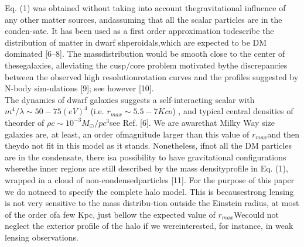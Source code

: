 \documentclass{article}\newcommand\Star[1]{#1\textsuperscript{*}}
\begin{document}
\begin{multicols}{2}
	Eq. (1) was obtained without taking into account thegravitational influence of any other matter sources, andassuming that all the scalar particles are in the conden-sate.  It has been used as a first order approximation todescribe the distribution of matter in dwarf shperoidals,which are expected to be DM dominated [6–8].  The massdistribution would be smooth close to the center of thesegalaxies, alleviating the cusp/core problem motivated bythe  discrepancies  between  the  observed  high  resolutionrotation curves and the profiles suggested by N-body sim-ulations [9]; see however [10].\\
	The   dynamics   of   dwarf   galaxies   suggests   a   self-interacting  scalar  with \(m^{4}/\lambda\sim50-75(eV)^{4}\) (i.e. \( r_{max}\sim5.5-7Kco\)) , and typical central densities of theorder of \(\rho c\sim10^{-3}M_{\odot}/pc^{3}\)see Ref. [6].  We are awarethat  Milky  Way  size  galaxies  are,  at  least,  an  order  ofmagnitude larger than this value of \(r_{max}\)and then theydo  not  fit  in  this  model  as  it  stands.   Nonetheless,  ifnot all the DM particles are in the condensate, there isa  possibility  to  have  gravitational  configurations  wherethe inner regions are still described by the mass densityprofile in Eq.  (1), wrapped in a cloud of non-condensedparticles [11].  For the purpose of this paper we do notneed to specify the complete halo model.  This is becausestrong lensing is not very sensitive to the mass distribu-tion outside the Einstein radius, at most of the order ofa few Kpc, just bellow the expected value of \(r_{max}\)Wecould not neglect the exterior profile of the halo if we wereinterested, for instance, in weak lensing observations.
    \cite{bertone2005particle}
    \cite{peccei1977cp}
    \cite{turner1983coherent}

\end{multicols}
\end{document}
